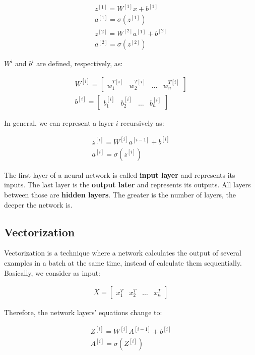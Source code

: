 \begin{align}\label{eq:nn_begin}
z^{[1]} = W^{[1]}x + b^{[1]}\\
a^{[1]} = \sigma(z^{[1]})\\
z^{[2]} = W^{[2]}a^{[1]} + b^{[2]}\\
a^{[2]} = \sigma(z^{[2]})
\label{eq:nn_final}
\end{align}

$W^{i}$ and $b^{i}$ are defined, respectively, as:

\begin{align}
W^{[i]} = \begin{bmatrix}
w^{T[i]}_1 & w^{T[i]}_2 & \dots & w^{T[i]}_n
\end{bmatrix} \\
b^{[i]} = \begin{bmatrix}
b^{[i]}_1 & b^{[i]}_2 & \dots & b^{[i]}_n
\end{bmatrix}
\end{align}

In general, we can represent a layer $i$ recursively as:

\begin{align}
z^{[i]} = W^{[i]}a^{[i-1]} + b^{[i]}\\
a^{[i]} = \sigma(z^{[i]})
\end{align}


The first layer of a neural network is called \textbf{input layer} and represents its inputs. The last layer is the \textbf{output later} and represents its outputs. All layers between those are \textbf{hidden layers}. The greater is the number of layers, the deeper the network is.

\subsection{Vectorization}\label{sec:vectorization}

Vectorization is a technique where a network calculates the output of several examples in a batch at the same time, instead of calculate them sequentially. Basically, we consider as input:

\begin{align}
X = \begin{bmatrix}
x^{T}_1 & x^{T}_2 & \dots & x^{T}_n
\end{bmatrix}
\end{align}

Therefore, the network layers' equations change to:

\begin{align}
Z^{[i]} = W^{[i]}A^{[i-1]} + b^{[i]}\\
A^{[i]} = \sigma(Z^{[i]})
\end{align}

